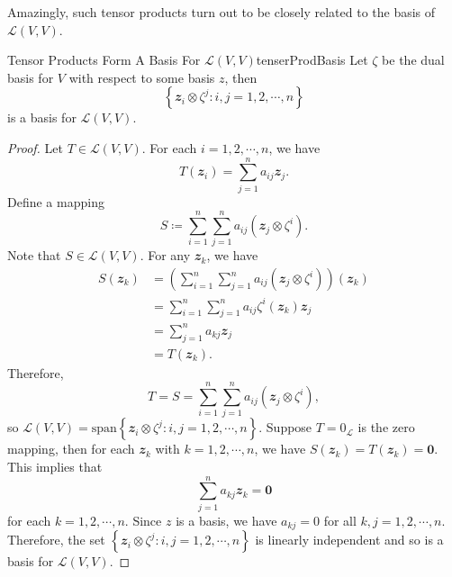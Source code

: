 \documentclass[math]{amznotes}
\theoremstyle{remark}
\newcommand{\zero}{\mathbf{0}}
\begin{document}
Amazingly, such tensor products turn out to be closely related to the basis of $\mathcal{L}(V, V)$.
\begin{probox}{Tensor Products Form A Basis For $\mathcal{L}(V, V)$}{tenserProdBasis}
    Let $\zeta$ be the dual basis for $V$ with respect to some basis $z$, then 
    \begin{equation*}
        \left\{\mathbfit{z}_i \otimes \zeta^j \colon i, j = 1, 2, \cdots, n\right\}
    \end{equation*}
    is a basis for $\mathcal{L}(V, V)$.
    \tcblower
    \begin{proof}
        Let $T \in \mathcal{L}(V, V)$. For each $i = 1, 2, \cdots, n$, we have
        \begin{equation*}
            T(\mathbfit{z}_i) = \sum_{j = 1}^{n}a_{ij}\mathbfit{z}_j.
        \end{equation*}
        Define a mapping
        \begin{equation*}
            S \coloneqq \sum_{i = 1}^{n}\sum_{j = 1}^{n}a_{ij}(\mathbfit{z}_j \otimes \zeta^i).
        \end{equation*}
        Note that $S \in \mathcal{L}(V, V)$. For any $\mathbfit{z}_k$, we have
        \begin{align*}
            S(\mathbfit{z}_k) & = \left(\sum_{i = 1}^{n}\sum_{j = 1}^{n}a_{ij}(\mathbfit{z}_j \otimes \zeta^i)\right)(\mathbfit{z}_k) \\
            & = \sum_{i = 1}^{n}\sum_{j = 1}^{n}a_{ij}\zeta^i(\mathbfit{z}_k)\mathbfit{z}_j \\
            & = \sum_{j = 1}^{n}a_{kj}\mathbfit{z}_j \\
            & = T(\mathbfit{z}_k).
        \end{align*}
        Therefore, 
        \begin{equation*}
            T = S = \sum_{i = 1}^{n}\sum_{j = 1}^{n}a_{ij}(\mathbfit{z}_j \otimes \zeta^i),
        \end{equation*} 
        so $\mathcal{L}(V, V) = \mathrm{span}\left\{\mathbfit{z}_i \otimes \zeta^j \colon i, j = 1, 2, \cdots, n\right\}$. Suppose $T = 0_{\mathcal{L}}$ is the zero mapping, then for each $\mathbfit{z}_k$ with $k = 1, 2, \cdots, n$, we have $S(\mathbfit{z}_k) = T(\mathbfit{z}_k) = \zero$. This implies that 
        \begin{equation*}
            \sum_{j = 1}^{n}a_{kj}\mathbfit{z}_k = \zero
        \end{equation*}
        for each $k = 1, 2, \cdots, n$. Since $z$ is a basis, we have $a_{kj} = 0$ for all $k, j = 1, 2, \cdots, n$. Therefore, the set $\left\{\mathbfit{z}_i \otimes \zeta^j \colon i, j = 1, 2, \cdots, n\right\}$
        is linearly independent and so is a basis for $\mathcal{L}(V, V)$.
    \end{proof}
\end{probox}
\end{document}
